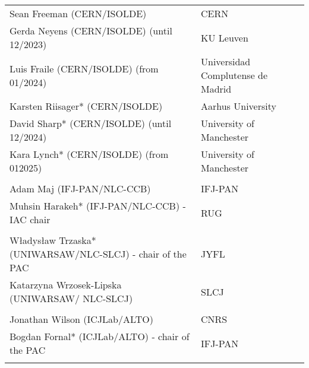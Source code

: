 \begin{longtable}{|L{0.48\textwidth}|C{0.48\textwidth}|}
      \\ \hline
    Sean Freeman (CERN/ISOLDE)	& CERN \\ \hline
    Gerda Neyens (CERN/ISOLDE) (until 12/2023)	& KU Leuven \\ \hline
    Luis Fraile (CERN/ISOLDE) (from 01/2024)	& Universidad Complutense de Madrid \\ \hline
    Karsten Riisager* (CERN/ISOLDE)	& Aarhus University \\ \hline
    David Sharp* (CERN/ISOLDE) (until 12/2024)	& University of Manchester \\ \hline
    Kara Lynch* (CERN/ISOLDE) (from 012025)	& University of Manchester \\ \hline
    
      \\ \hline
    Adam Maj (IFJ-PAN/NLC-CCB)	& IFJ-PAN \\ \hline
    Muhsin Harakeh*  (IFJ-PAN/NLC-CCB) - IAC chair	& RUG \\ \hline

      \\ \hline
    Władysław Trzaska* (UNIWARSAW/NLC-SLCJ) - chair of the PAC	& JYFL \\ \hline
    Katarzyna Wrzosek-Lipska (UNIWARSAW/ NLC-SLCJ)	& SLCJ \\ \hline

        \pagebreak
      \\ \hline
    Jonathan Wilson (ICJLab/ALTO)	& CNRS \\ \hline
    Bogdan Fornal* (ICJLab/ALTO) - chair of the PAC	& IFJ-PAN \\ \hline

      \\ \hline
   

\end{longtable}

